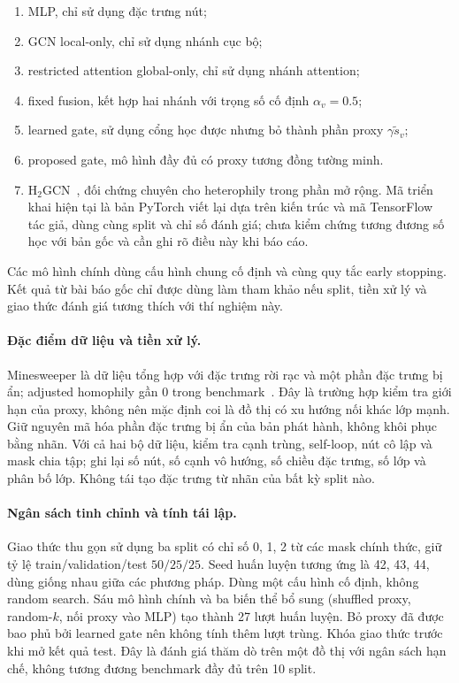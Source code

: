 \documentclass[12pt,a4paper]{article}
\numberwithin{equation}{section}
\theoremstyle{definition}
\begin{document}
\begin{enumerate}
    \item MLP, chỉ sử dụng đặc trưng nút;
    \item GCN local-only, chỉ sử dụng nhánh cục bộ;
    \item restricted attention global-only, chỉ sử dụng nhánh attention;
    \item fixed fusion, kết hợp hai nhánh với trọng số cố định
    $\alpha_v=0.5$;
    \item learned gate, sử dụng cổng học được nhưng bỏ thành phần
    proxy $\gamma\widetilde{s}_v$;
    \item proposed gate, mô hình đầy đủ có proxy tương đồng tường minh.
    \item H$_2$GCN~\cite{zhu2020h2gcn}, đối chứng chuyên cho heterophily trong phần mở rộng. Mã triển khai hiện tại là bản PyTorch viết lại dựa trên kiến trúc và mã TensorFlow tác giả, dùng cùng split và chỉ số đánh giá; chưa kiểm chứng tương đương số học với bản gốc và cần ghi rõ điều này khi báo cáo.
\end{enumerate}

Các mô hình chính dùng cấu hình chung cố định và cùng quy tắc
early stopping. Kết quả từ bài báo gốc chỉ được dùng làm tham khảo nếu
split, tiền xử lý và giao thức đánh giá tương thích với thí nghiệm này.

\paragraph{Đặc điểm dữ liệu và tiền xử lý.}
Minesweeper là dữ liệu tổng hợp với đặc trưng rời rạc và một phần đặc trưng bị ẩn; adjusted homophily gần $0$ trong benchmark~\cite{platonov2023critical}. Đây là trường hợp kiểm tra giới hạn của proxy, không nên mặc định coi là đồ thị có xu hướng nối khác lớp mạnh. Giữ nguyên mã hóa phần đặc trưng bị ẩn của bản phát hành, không khôi phục bằng nhãn. Với cả hai bộ dữ liệu, kiểm tra cạnh trùng, self-loop, nút cô lập và mask chia tập; ghi lại số nút, số cạnh vô hướng, số chiều đặc trưng, số lớp và phân bố lớp. Không tái tạo đặc trưng từ nhãn của bất kỳ split nào.

\paragraph{Ngân sách tinh chỉnh và tính tái lập.}
Giao thức thu gọn sử dụng ba split có chỉ số 0, 1, 2 từ các mask chính thức, giữ tỷ lệ train/validation/test $50/25/25$. Seed huấn luyện tương ứng là 42, 43, 44, dùng giống nhau giữa các phương pháp. Dùng một cấu hình cố định, không random search. Sáu mô hình chính và ba biến thể bổ sung (shuffled proxy, random-$k$, nối proxy vào MLP) tạo thành 27 lượt huấn luyện. Bỏ proxy đã được bao phủ bởi learned gate nên không tính thêm lượt trùng. Khóa giao thức trước khi mở kết quả test. Đây là đánh giá thăm dò trên một đồ thị với ngân sách hạn chế, không tương đương benchmark đầy đủ trên 10 split.
\end{document}
